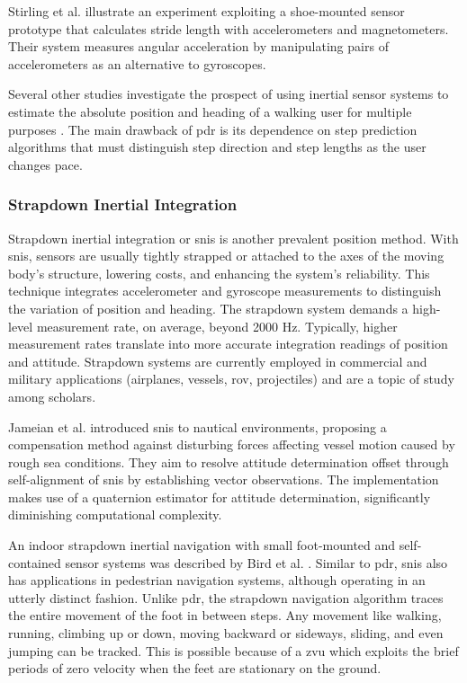 Stirling et al. \cite{stirling2003innovative} illustrate an experiment exploiting a shoe-mounted sensor prototype that calculates stride length with accelerometers and magnetometers. Their system measures angular acceleration by manipulating pairs of accelerometers as an alternative to gyroscopes.

Several other studies investigate the prospect of using inertial sensor systems to estimate the absolute position and heading of a walking user for multiple purposes \cite{steinhoff2010dead}\cite{weinberg2002using}\cite{kim2004step} \cite{collin2002mems}. The main drawback of \acrshort{pdr} is its dependence on step prediction algorithms that must distinguish step direction and step lengths as the user changes pace.

\subsubsection{Strapdown Inertial Integration}

Strapdown inertial integration or \acrfull{snis} is another prevalent position method. With \acrshort{snis}, sensors are usually tightly strapped or attached to the axes of the moving body's structure, lowering costs, and enhancing the system's reliability. This technique integrates accelerometer and gyroscope measurements to distinguish the variation of position and heading. The strapdown system demands a high-level measurement rate, on average, beyond 2000 Hz. Typically, higher measurement rates translate into more accurate integration readings of position and attitude. Strapdown systems are currently employed in commercial and military applications (airplanes, vessels, \acrfull{rov}, projectiles) and are a topic of study among scholars.

Jameian et al. \cite{jameian2019robust}  introduced \acrshort{snis} to nautical environments, proposing a compensation method against disturbing forces affecting vessel motion caused by rough sea conditions. They aim to resolve attitude determination offset through self-alignment of \acrshort{snis} by establishing vector observations. The implementation makes use of a quaternion estimator for attitude determination, significantly diminishing computational complexity.

An indoor strapdown inertial navigation with small foot-mounted and self-contained sensor systems was described by Bird et al. \cite{bird2011indoor}. Similar to \acrshort{pdr}, \acrshort{snis} also has applications in pedestrian navigation systems, although operating in an utterly distinct fashion. Unlike \acrshort{pdr}, the strapdown navigation algorithm traces the entire movement of the foot in between steps. Any movement like walking, running, climbing up or down, moving backward or sideways, sliding, and even jumping can be tracked. This is possible because of a \acrfull{zvu} which exploits the brief periods of zero velocity when the feet are stationary on the ground.

